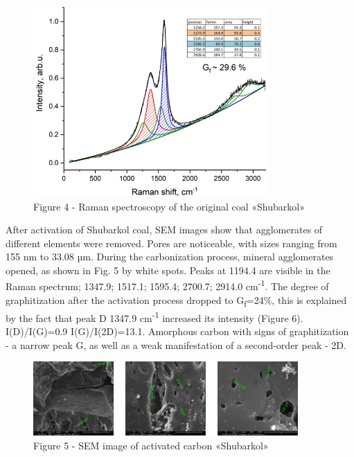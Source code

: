 \begin{figure}[H]
	\centering
	\includegraphics[width=0.8\textwidth]{assets/56}
	\caption*{Figure 4 - Raman spectroscopy of the original coal «Shubarkol»}
\end{figure}

\begin{multicols}{2}
After activation of Shubarkol coal, SEM images show that agglomerates of
different elements were removed. Pores are noticeable, with sizes
ranging from 155 nm to 33.08 µm. During the carbonization process,
mineral agglomerates opened, as shown in Fig. 5 by white spots. Peaks at
1194.4 are visible in the Raman spectrum; 1347.9; 1517.1; 1595.4;
2700.7; 2914.0 cm\textsuperscript{-1}. The degree of graphitization
after the activation process dropped to G\textsubscript{f}=24\%, this is
explained by the fact that peak D 1347.9 cm\textsuperscript{-1}
increased its intensity (Figure 6). I(D)/I(G)=0.9 I(G)/I(2D)=13.1.
Amorphous carbon with signs of graphitization - a narrow peak G, as well
as a weak manifestation of a second-order peak - 2D.
\end{multicols}

\begin{figure}[H]
	\centering
	\includegraphics[width=0.9\textwidth]{assets/57}
	\caption*{Figure 5 - SEM image of activated carbon «Shubarkol»}
\end{figure}

